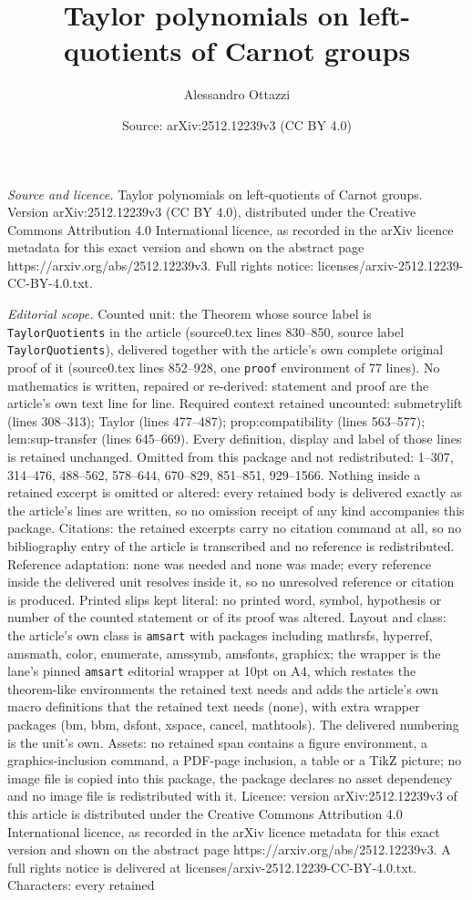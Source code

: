 \documentclass[10pt,a4paper]{amsart}
\title[Taylor polynomials on left-quotients of Carnot groups]{Taylor polynomials on left-quotients of Carnot groups}
\author{Alessandro Ottazzi}
\date{Source: arXiv:2512.12239v3 (CC BY 4.0)}
\begin{document}
\maketitle

\noindent\emph{Source and licence.} Taylor polynomials on left-quotients of Carnot groups. Version arXiv:2512.12239v3 (CC BY 4.0), distributed under the Creative Commons Attribution 4.0 International licence, as recorded in the arXiv licence metadata for this exact version and shown on the abstract page https://arxiv.org/abs/2512.12239v3. Full rights notice: licenses/arxiv-2512.12239-CC-BY-4.0.txt.\par\smallskip

\noindent\textit{Editorial scope.} Counted unit: the Theorem whose source label is \texttt{TaylorQuotients} in the article (source0.tex lines 830--850, source label \texttt{TaylorQuotients}), delivered together with the article's own complete original proof of it (source0.tex lines 852--928, one \texttt{proof} environment of 77 lines). No mathematics is written, repaired or re-derived: statement and proof are the article's own text line for line. Required context retained uncounted: submetrylift (lines 308--313); Taylor (lines 477--487); prop:compatibility (lines 563--577); lem:sup-transfer (lines 645--669). Every definition, display and label of those lines is retained unchanged. Omitted from this package and not redistributed: 1--307, 314--476, 488--562, 578--644, 670--829, 851--851, 929--1566. Nothing inside a retained excerpt is omitted or altered: every retained body is delivered exactly as the article's lines are written, so no omission receipt of any kind accompanies this package. Citations: the retained excerpts carry no citation command at all, so no bibliography entry of the article is transcribed and no reference is redistributed. Reference adaptation: none was needed and none was made; every reference inside the delivered unit resolves inside it, so no unresolved reference or citation is produced. Printed slips kept literal: no printed word, symbol, hypothesis or number of the counted statement or of its proof was altered. Layout and class: the article's own class is \texttt{amsart} with packages including mathrsfs, hyperref, amsmath, color, enumerate, amssymb, amsfonts, graphicx; the wrapper is the lane's pinned \texttt{amsart} editorial wrapper at 10pt on A4, which restates the theorem-like environments the retained text needs and adds the article's own macro definitions that the retained text needs (none), with extra wrapper packages (bm, bbm, dsfont, xspace, cancel, mathtools). The delivered numbering is the unit's own. Assets: no retained span contains a figure environment, a graphics-inclusion command, a PDF-page inclusion, a table or a TikZ picture; no image file is copied into this package, the package declares no asset dependency and no image file is redistributed with it. Licence: version arXiv:2512.12239v3 of this article is distributed under the Creative Commons Attribution 4.0 International licence, as recorded in the arXiv licence metadata for this exact version and shown on the abstract page https://arxiv.org/abs/2512.12239v3. A full rights notice is delivered at licenses/arxiv-2512.12239-CC-BY-4.0.txt. Characters: every retained 
\end{document}
